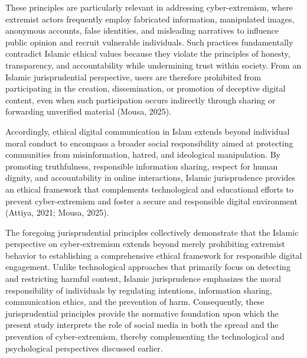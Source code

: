 \documentclass[10pt]{NSP1}
\begin{document}
These principles are particularly relevant in addressing cyber-extremism, where extremist actors frequently employ fabricated information, manipulated images, anonymous accounts, false identities, and misleading narratives to influence public opinion and recruit vulnerable individuals. Such practices fundamentally contradict Islamic ethical values because they violate the principles of honesty, transparency, and accountability while undermining trust within society. From an Islamic jurisprudential perspective, users are therefore prohibited from participating in the creation, dissemination, or promotion of deceptive digital content, even when such participation occurs indirectly through sharing or forwarding unverified material (Mousa, 2025).

Accordingly, ethical digital communication in Islam extends beyond individual moral conduct to encompass a broader social responsibility aimed at protecting communities from misinformation, hatred, and ideological manipulation. By promoting truthfulness, responsible information sharing, respect for human dignity, and accountability in online interactions, Islamic jurisprudence provides an ethical framework that complements technological and educational efforts to prevent cyber-extremism and foster a secure and responsible digital environment (Attiya, 2021; Mousa, 2025).

The foregoing jurisprudential principles collectively demonstrate that the Islamic perspective on cyber-extremism extends beyond merely prohibiting extremist behavior to establishing a comprehensive ethical framework for responsible digital engagement. Unlike technological approaches that primarily focus on detecting and restricting harmful content, Islamic jurisprudence emphasizes the moral responsibility of individuals by regulating intentions, information sharing, communication ethics, and the prevention of harm. Consequently, these jurisprudential principles provide the normative foundation upon which the present study interprets the role of social media in both the spread and the prevention of cyber-extremism, thereby complementing the technological and psychological perspectives discussed earlier.

\par\medskip{}\smallskip
\end{document}

